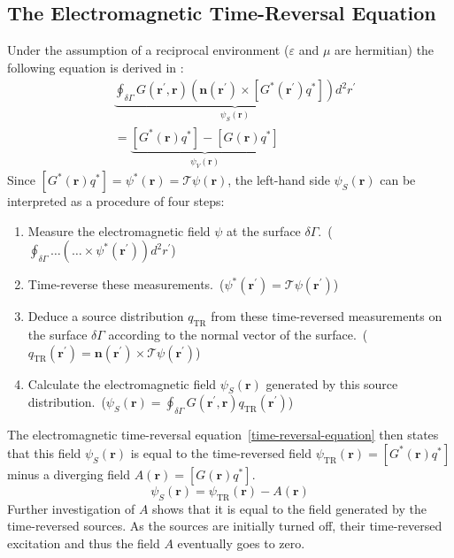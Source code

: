\subsection{The Electromagnetic Time-Reversal Equation}
Under the assumption of a reciprocal environment (\(\varepsilon \) and \(\mu \) are hermitian) the following equation is derived in \parencite{de_rosny_theory_2010}:
\begin{equation}\label{time-reversal-equation}
    \begin{aligned}
    & \underbrace{\oint_{\delta \Gamma} G(\bm{r}^{\prime}, \bm{r})\left(\bm{n}\left(\bm{r}^{\prime}\right) \times\left[G^*\left(\bm{r}^{\prime}\right) q^*\right]\right) d^2 r^{\prime}}_{\psi_S(\bm{r})} \\
    &=\underbrace{[G^*(\bm{r}) q^*] - [G(\bm{r}) q^*]}_{\psi_V(\bm{r})}
    \end{aligned}
\end{equation}
Since \([G^*(\bm{r}) q^*] = \psi^*(\bm{r}) = \mathcal{T}\psi(\bm{r})\), the left-hand side \(\psi_S(\bm{r})\) can be interpreted as a procedure of four steps:
\begin{enumerate}
    \item Measure the electromagnetic field \(\psi \) at the surface \(\delta \Gamma \).\ (\(\oint_{\delta \Gamma} \ldots  (\ldots \times \psi^*(\bm{r}^{\prime})) d^2 r^{\prime}\))
    \item Time-reverse these measurements.\ (\(\psi^*(\bm{r}^{\prime}) = \mathcal{T}\psi(\bm{r}^{\prime})\))
    \item Deduce a source distribution \(q_{\text{TR}}\) from these time-reversed measurements on the surface \(\delta \Gamma \) according to the normal vector of the surface.\ (\(q_{\text{TR}}(\bm{r}^{\prime}) = \bm{n}(\bm{r}^{\prime}) \times \mathcal{T}\psi(\bm{r}^{\prime})\))
    \item Calculate the electromagnetic field \(\psi_S(\bm{r})\) generated by this source distribution.\ (\(\psi_S(\bm{r}) = \oint_{\delta \Gamma} G(\bm{r}^{\prime}, \bm{r}) q_{\text{TR}}(\bm{r}^{\prime})\))
\end{enumerate}
The electromagnetic time-reversal equation~\eqref{time-reversal-equation} then states that this field \(\psi_S(\bm{r})\) is equal to the time-reversed field \(\psi_{\text{TR}}(\bm{r}) = [G^*(\bm{r}) q^*]\) minus a diverging field \(A(\bm{r}) = [G(\bm{r}) q^*]\).
\begin{equation}
    \psi_S(\bm{r}) = \psi_{\text{TR}}(\bm{r}) - A(\bm{r})
\end{equation}
Further investigation of \(A\) shows that it is equal to the field generated by the time-reversed sources.
As the sources are initially turned off, their time-reversed excitation and thus the field \(A\) eventually goes to zero.

